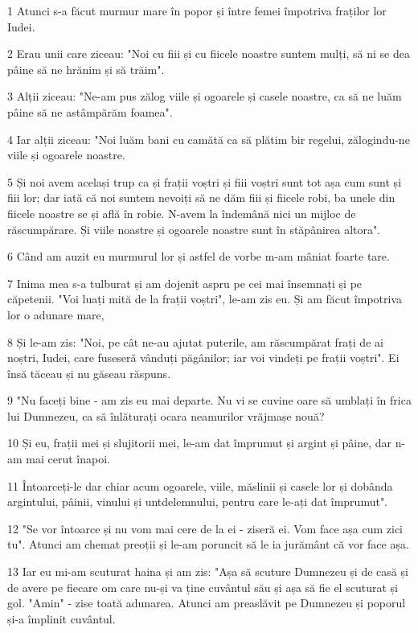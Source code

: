 \par 1 Atunci s-a făcut murmur mare în popor și între femei împotriva fraților lor Iudei.
\par 2 Erau unii care ziceau: "Noi cu fiii și cu fiicele noastre suntem mulți, să ni se dea pâine să ne hrănim și să trăim".
\par 3 Alții ziceau: "Ne-am pus zălog viile și ogoarele și casele noastre, ca să ne luăm pâine să ne astâmpărăm foamea".
\par 4 Iar alții ziceau: "Noi luăm bani cu camătă ca să plătim bir regelui, zălogindu-ne viile și ogoarele noastre.
\par 5 Și noi avem același trup ca și frații voștri și fiii voștri sunt tot așa cum sunt și fiii lor; dar iată că noi suntem nevoiți să ne dăm fiii și fiicele robi, ba unele din fiicele noastre se și află în robie. N-avem la îndemână nici un mijloc de răscumpărare. Și viile noastre și ogoarele noastre sunt în stăpânirea altora".
\par 6 Când am auzit eu murmurul lor și astfel de vorbe m-am mâniat foarte tare.
\par 7 Inima mea s-a tulburat și am dojenit aspru pe cei mai însemnați și pe căpetenii. "Voi luați mită de la frații voștri", le-am zis eu. Și am făcut împotriva lor o adunare mare,
\par 8 Și le-am zis: "Noi, pe cât ne-au ajutat puterile, am răscumpărat frați de ai noștri, Iudei, care fuseseră vânduți păgânilor; iar voi vindeți pe frații voștri". Ei însă tăceau și nu găseau răspuns.
\par 9 "Nu faceți bine - am zis eu mai departe. Nu vi se cuvine oare să umblați în frica lui Dumnezeu, ca să înlăturați ocara neamurilor vrăjmașe nouă?
\par 10 Și eu, frații mei și slujitorii mei, le-am dat împrumut și argint și pâine, dar n-am mai cerut înapoi.
\par 11 Întoarceți-le dar chiar acum ogoarele, viile, măslinii și casele lor și dobânda argintului, pâinii, vinului și untdelemnului, pentru care le-ați dat împrumut".
\par 12 "Se vor întoarce și nu vom mai cere de la ei - ziseră ei. Vom face așa cum zici tu". Atunci am chemat preoții și le-am poruncit să le ia jurământ că vor face așa.
\par 13 Iar eu mi-am scuturat haina și am zis: "Așa să scuture Dumnezeu și de casă și de avere pe fiecare om care nu-și va ține cuvântul său și așa să fie el scuturat și gol. "Amin" - zise toată adunarea. Atunci am preaslăvit pe Dumnezeu și poporul și-a împlinit cuvântul.
